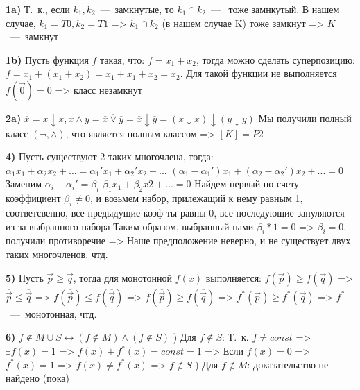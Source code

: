 \documentclass[12pt,a4paper,fleqn]{article}
\begin{document}
{\bf 1a)} Т.~к., если $k_1, k_2$~---~замкнутые, то $k_1 \cap k_2$~---~ тоже замнкутый. В нашем случае, $k_1 = T0, k_2 = T1$ =>  $k_1 \cap k_2$ (в нашем случае K) тоже замкнут => $K$~---~замкнут \newline


{\bf 1b)} Пусть функция $f$ такая, что: $f = x_1 + x_2$, тогда можно сделать суперпозицию: $f = x_1 + (x_1 + x_2) = x_1 + x_1 + x_2 = x_2$. Для такой функции не выполняется $f(\vec{0}) = 0$ => класс незамкнут \newline


{\bf 2a)} $\overline{x} = x \downarrow x, x \land y = \overline{\overline{x} \lor \overline{y}} = \overline{x} \downarrow \overline{y} = (x \downarrow x) \downarrow (y \downarrow y)$ \newline
Мы получили полный класс $(\neg, \land)$, что является полным классом => $[K] = P2$


{\bf 4)} Пусть существуют 2 таких многочлена, тогда: \newline
$\alpha_1 x_1 + \alpha_2 x_2 + ... = \alpha_1' x_1 + \alpha_2' x_2 + ...$ \newline
$(\alpha_1 - \alpha_1') x_1 + (\alpha_2 - \alpha_2') x_2 + ... = 0 $ | Заменим $\alpha_i - \alpha_i' = \beta_i$ \newline
$\beta_1x_1 + \beta_2x2 + ... = 0$ \newline
Найдем первый по счету коэффициент $\beta_i \ne 0$, и возьмем набор, прилежащий к нему равным 1, соответсвенно, все предыдущие коэф-ты равны 0, все последующие зануляются из-за выбранного набора \newline
Таким образом, выбранный нами $\beta_i * 1 = 0$ => $\beta_i = 0$, получили противоречие => Наше предположение неверно, и не существует двух таких многочленов, чтд. \newline


{\bf 5)}  Пусть $\vec{p} \geqslant \vec{q}$, тогда для монотонной $f(x)$ выполняется: $f(\vec{p}) \geqslant  f(\vec{q})$ \newline
=> $\overline{\vec{p}} \leqslant \overline{\vec{q}}$ => $f(\overline{\vec{p}}) \leqslant f(\overline{\vec{q}})$ => $\overline{f(\overline{\vec{p}})} \geqslant \overline{f(\overline{\vec{q}})}$ => $f^* (\vec{p}) \geqslant f^*(\vec{q})$ => $f^*$~---~монотонная, чтд. \newline


{\bf 6)} $f \notin M \cup S \leftrightarrow (f \notin M) \land (f \notin S)$ ) Для $f \notin S$: Т.~к. $f \ne const$ => $\exists f(x) = 1$ => $f(x) + f^*(x) = const = 1$ => \newline
Если $f(x) = 0$ => $f^*(x) = 1$ => $f(x) \ne f^*(x)$ => $f \notin S$ ) Для $f \notin M$: доказательство не найдено (пока) \newline
\end{document}
